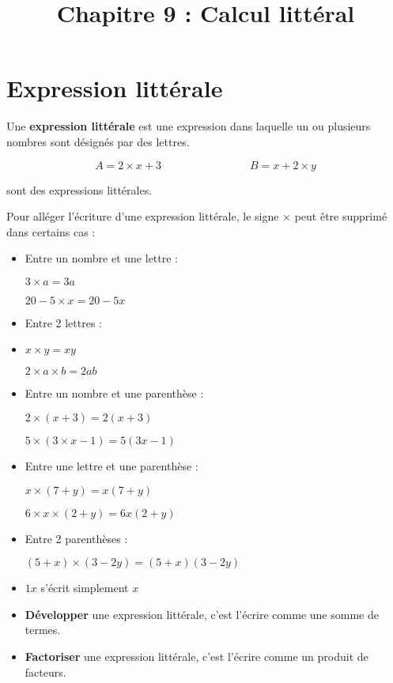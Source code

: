 \documentclass[a4paper,11pt]{article}
\title{Chapitre 9 : Calcul littéral}
\date{}
\author{}
\begin{document}
\maketitle

\section{Expression littérale}

\begin{cours}
	Une \textbf{expression littérale} est une expression dans laquelle un ou plusieurs nombres sont désignés par des lettres.
\end{cours}

\begin{exemple}
	$$ A = 2 × x + 3 \hspace{8em} B = x + 2 × y $$

	sont des expressions littérales.
\end{exemple}

\begin{cours}
	Pour alléger l'écriture d'une expression littérale, le signe × peut être supprimé dans certains cas :
	\begin{itemize}
		\item Entre un nombre et une lettre :

		      $3 × a = 3a$

		      $20 − 5 × x = 20 − 5 x$
		\item Entre 2 lettres :
		\item
		      $x × y = xy$

		      $2 × a × b = 2 ab$
		\item Entre un nombre et une parenthèse :

		      $2 × (x + 3) = 2(x + 3)$

		      $5 × (3 × x - 1) = 5(3x − 1)$
		\item Entre une lettre et une parenthèse :

		      $x × (7+ y) = x (7+ y)$

		      $6 × x × (2 + y)= 6x(2 + y)$
		\item Entre 2 parenthèses :

		      $(5 + x) × (3−2 y) = (5 + x) (3−2 y)$
		\item $1x$ s'écrit simplement $x$
	\end{itemize}
\end{cours}

\begin{cours}
	\begin{itemize}
		\item \textbf{Développer} une expression littérale, c’est l’écrire comme une somme de termes.
		\item \textbf{Factoriser} une expression littérale, c’est l’écrire comme un produit de facteurs.
	\end{itemize}
\end{cours}
\end{document}

